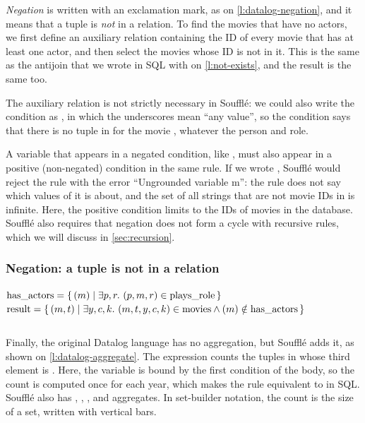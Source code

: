 \emph{Negation} is written with an exclamation mark, as on \autoref{l:datalog-negation}, and it means that a tuple is \emph{not} in a relation.
To find the movies that have no actors, we first define an auxiliary relation  containing the ID of every movie that has at least one actor, and then select the movies whose ID is not in it.
This is the same as the antijoin that we wrote in SQL with  on \autoref{l:not-exists}, and the result is the same too.

The auxiliary relation is not strictly necessary in Soufflé: we could also write the condition as , in which the underscores mean ``any value'', so the condition says that there is no tuple in  for the movie , whatever the person and role.

A variable that appears in a negated condition, like , must also appear in a positive (non-negated) condition in the same rule.
If we wrote , Soufflé would reject the rule with the error ``Ungrounded variable m'': the rule does not say which values of  it is about, and the set of all strings that are not movie IDs in  is infinite.
Here, the positive condition  limits  to the IDs of movies in the database.
Soufflé also requires that negation does not form a cycle with recursive rules, which we will discuss in \autoref{sec:recursion}.

\begin{frame}
    \label{s:datalog-negation}
    \frametitle{Negation: a tuple is not in a relation}
    \vspace{0.3em}
    {\footnotesize
    $\mathrm{has\_actors} = \{\, (m) \mid \exists p, r.\ (p, m, r) \in \mathrm{plays\_role} \,\}$\\[0.2em]
    $\mathrm{result} = \{\, (m, t) \mid \exists y, c, k.\ (m, t, y, c, k) \in \mathrm{movies} \wedge (m) \notin \mathrm{has\_actors} \,\}$}
    \par\vspace{0.3em}
    \inputminted[fontsize=\footnotesize]{sql}{code/datalog-negation.sql}
\end{frame}
\label{l:datalog-negation}

Finally, the original Datalog language has no aggregation, but Soufflé adds it, as shown on \autoref{l:datalog-aggregate}.
The expression  counts the tuples in  whose third element is .
Here, the variable  is bound by the first condition of the body, so the count is computed once for each year, which makes the rule equivalent to  in SQL.
Soufflé also has , , , and  aggregates.
In set-builder notation, the count is the size of a set, written with vertical bars.


